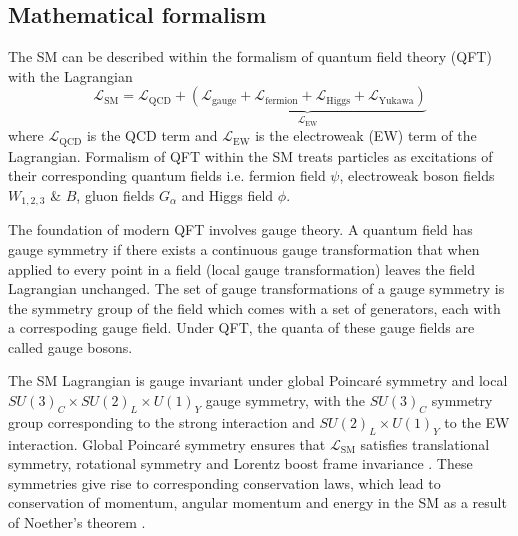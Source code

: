 \documentclass[../thesis.tex]{subfiles}
\begin{document}
\subsection{Mathematical formalism}
The \acs{SM} can be described within the formalism of quantum field theory (\acs{QFT}) with the Lagrangian \citep{GrossmanNir2023}
\begin{equation}
\mathcal{L}_\mathrm{SM} = \mathcal{L}_\mathrm{QCD} + {\underbrace{(\mathcal{L}_\mathrm{gauge}+\mathcal{L}_\mathrm{fermion}+\mathcal{L}_\mathrm{Higgs}+\mathcal{L}_\mathrm{Yukawa})}_{\mathcal{L}_\mathrm{EW}}}
\end{equation}
where $\mathcal{L}_\mathrm{QCD}$ is the \acs{QCD} term and $\mathcal{L}_\mathrm{EW}$ is the electroweak (\acs{EW}) term of the Lagrangian. Formalism of \acs{QFT} within the \acs{SM} treats particles as excitations \citep{theory:qft} of their corresponding quantum fields i.e. fermion field $\psi$, electroweak boson fields $W_{1,2,3}$ \& $B$, gluon fields $G_\alpha$ and Higgs field $\phi$.

The foundation of modern \acs{QFT} involves gauge theory. A quantum field has gauge symmetry if there exists a continuous gauge transformation that when applied to every point in a field (local gauge transformation) leaves the field Lagrangian unchanged. The set of gauge transformations of a gauge symmetry is the symmetry group of the field which comes with a set of generators, each with a correspoding gauge field. Under \acs{QFT}, the quanta of these gauge fields are called gauge bosons.

The \acs{SM} Lagrangian is gauge invariant under global Poincar\'e symmetry and local $SU(3)_C \times SU(2)_L \times U(1)_Y$ gauge symmetry, with the $SU(3)_C$ symmetry group corresponding to the strong interaction and $SU(2)_L \times U(1)_Y$ to the \acs{EW} interaction. Global Poincar\'e symmetry ensures that $\mathcal{L}_\mathrm{SM}$ satisfies translational symmetry, rotational symmetry and Lorentz boost frame invariance \citep{theory:symmetry}. These symmetries give rise to corresponding conservation laws, which lead to conservation of momentum, angular momentum and energy in the \acs{SM} as a result of Noether's theorem \citep{Ba_ados_2016}.
\end{document}
